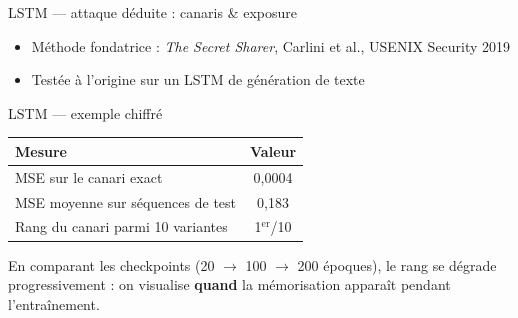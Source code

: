 \documentclass[11pt]{beamer}
\begin{document}
\begin{frame}{LSTM --- attaque déduite : canaris \& exposure}
  \begin{center}
  \end{center}
  \begin{itemize}
    \item Méthode fondatrice : \emph{The Secret Sharer}, Carlini et al., USENIX Security 2019
    \item Testée à l'origine sur un LSTM de génération de texte
  \end{itemize}
\end{frame}

\begin{frame}{LSTM --- exemple chiffré}
  \begin{table}
  \centering
  \begin{tabular}{lc}
    \toprule
    \textbf{Mesure} & \textbf{Valeur} \\
    \midrule
    MSE sur le canari exact & 0{,}0004 \\
    MSE moyenne sur séquences de test & 0{,}183 \\
    Rang du canari parmi 10 variantes & 1$^{\text{er}}$/10 \\
    \bottomrule
  \end{tabular}
  \end{table}
  \vspace{3mm}
  En comparant les checkpoints (20 $\to$ 100 $\to$ 200 époques), le
  rang se dégrade progressivement : on visualise \textbf{quand}
  la mémorisation apparaît pendant l'entraînement.
\end{frame}
\end{document}
